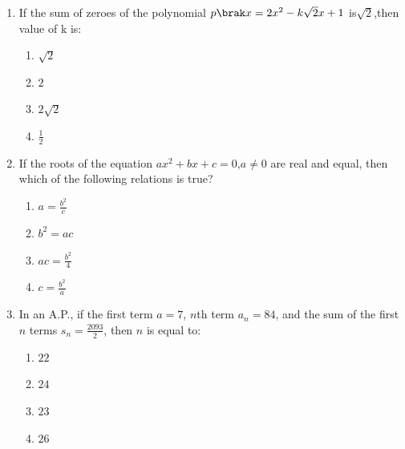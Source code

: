 
\begin{enumerate}


\item If the sum of zeroes of the polynomial $ p\brak x = 2x^2 - k\sqrt2x+1 $ is${\sqrt2} $,then value of k is:
\begin{enumerate}
    \item $ \sqrt{2} $
    \item $2$
    \item $ 2  \sqrt{2} $
    \item $ \frac{1}{2} $
 \end{enumerate}

\item If the roots of the equation $ax^2 + bx + c = 0$,$a \neq 0$ are real and equal, then which of the following relations is true?
\begin{enumerate}    
    \item $a = \frac{b^2}{c}$
    \item $b^2 = ac$                                                                                    \item $ac = \frac{b^2}{4}$
    \item $c = \frac{b^2}{a}$
\end{enumerate}

\item In an A.P., if the first term $a = 7$, $n$th term $a_{n} = 84$, and the sum of the first $n$ terms $s_{n} = \frac{2093}{2}$, then $n$ is equal to:
\begin{enumerate}
    \item $22$
    \item $24$
    \item $23$
    \item $26$
\end{enumerate}


\end{enumerate}
